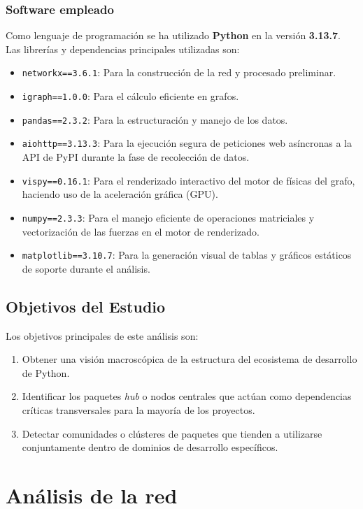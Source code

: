 \documentclass[12pt,a4paper]{report}
\begin{document}
	\subsection{Software empleado}
	Como lenguaje de programación se ha utilizado \textbf{Python} en la versión \textbf{3.13.7}. Las librerías y dependencias principales utilizadas son:
	\begin{itemize}
		\item \texttt{networkx==3.6.1}: Para la construcción de la red y procesado preliminar.
		\item \texttt{igraph==1.0.0}: Para el cálculo eficiente en grafos.
		\item \texttt{pandas==2.3.2}: Para la estructuración y manejo de los datos.
		\item \texttt{aiohttp==3.13.3}: Para la ejecución segura de peticiones web asíncronas a la API de PyPI durante la fase de recolección de datos.
		\item \texttt{vispy==0.16.1}: Para el renderizado interactivo del motor de físicas del grafo, haciendo uso de la aceleración gráfica (GPU).
		\item \texttt{numpy==2.3.3}: Para el manejo eficiente de operaciones matriciales y vectorización de las fuerzas en el motor de renderizado.
		\item \texttt{matplotlib==3.10.7}: Para la generación visual de tablas y gráficos estáticos de soporte durante el análisis.
	\end{itemize}

	
	\section{Objetivos del Estudio}
	Los objetivos principales de este análisis son:
	\begin{enumerate}
		\item Obtener una visión macroscópica de la estructura del ecosistema de desarrollo de Python.
		\item Identificar los paquetes \textit{hub} o nodos centrales que actúan como dependencias críticas transversales para la mayoría de los proyectos.
		\item Detectar comunidades o clústeres de paquetes que tienden a utilizarse conjuntamente dentro de dominios de desarrollo específicos.
	\end{enumerate}
	
	\chapter{Análisis de la red}
\end{document}
